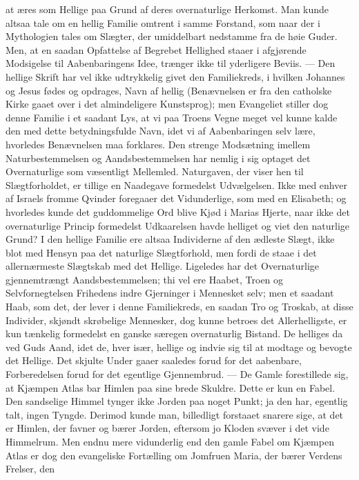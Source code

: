 \documentclass[12pt,a4paper]{book}
\begin{document}
at æres som Hellige paa Grund af deres overnaturlige Herkomst. Man kunde altsaa
tale om en hellig Familie omtrent i samme Forstand, som naar der i Mythologien
tales om Slægter, der umiddelbart nedstamme fra de høie Guder. Men, at en saadan
Opfattelse af Begrebet Hellighed staaer i afgjørende Modsigelse til
Aabenbaringens Idee, trænger ikke til yderligere Beviis. --- Den hellige Skrift
har vel ikke udtrykkelig givet den Familiekreds, i hvilken Johannes og Jesus
fødes og opdrages, Navn af hellig (Benævnelsen er fra den catholske Kirke gaaet
over i det almindeligere
Kunstsprog); men Evangeliet stiller dog denne Familie i et saadant Lys, at vi
paa Troens Vegne meget vel kunne kalde den med dette betydningsfulde Navn, idet
vi af Aabenbaringen selv lære, hvorledes Benævnelsen maa forklares. Den strenge
Modsætning imellem Naturbestemmelsen og Aandsbestemmelsen har nemlig i sig
optaget det Overnaturlige som væsentligt Mellemled. Naturgaven, der viser hen
til Slægtforholdet, er tillige en Naadegave formedelst Udvælgelsen. Ikke med
enhver af Israels fromme Qvinder foregaaer det Vidunderlige, som med en
Elisabeth; og hvorledes kunde det guddommelige Ord blive Kjød i Marias Hjerte,
naar ikke det overnaturlige Princip formedelst Udkaarelsen havde helliget og
viet den naturlige Grund? I den hellige Familie ere altsaa Individerne af den
ædleste Slægt, ikke blot med Hensyn paa det naturlige Slægtforhold, men fordi de
staae i det allernærmeste Slægtskab med det Hellige. Ligeledes har det
Overnaturlige gjennemtrængt Aandsbestemmelsen; thi vel ere Haabet, Troen og
Selvfornegtelsen Frihedens indre Gjerninger i Mennesket selv; men et saadant
Haab, som det, der lever i denne Familiekreds, en saadan Tro og Troskab, at
disse Individer, skjøndt skrøbelige Mennesker, dog kunne betroes det
Allerhelligste, er kun tænkelig formedelst en ganske særegen overnaturlig
Bistand. De helliges da ved Guds Aand, idet de, hver især, hellige og indvie sig
til at modtage og bevogte det Hellige. Det skjulte Under gaaer saaledes forud
for det aabenbare, Forberedelsen forud for det egentlige Gjennembrud. --- De
Gamle forestillede sig, at Kjæmpen Atlas bar Himlen paa sine brede Skuldre.
Dette er kun en Fabel. Den sandselige Himmel tynger ikke Jorden paa noget Punkt;
ja den har, egentlig talt, ingen Tyngde. Derimod kunde man, billedligt forstaaet
snarere sige, at det er Himlen, der favner og bærer Jorden, eftersom jo Kloden
svæver i det vide Himmelrum.
Men endnu mere vidunderlig end den gamle Fabel om Kjæmpen Atlas er dog den
evangeliske Fortælling om Jomfruen Maria, der bærer Verdens Frelser, den
\end{document}
